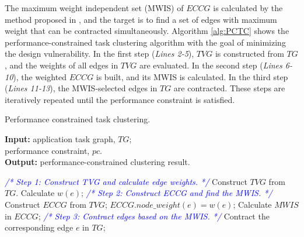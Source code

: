 \documentclass[10pt,journal, compsoc]{IEEEtran}
\begin{document}
The maximum weight independent set (MWIS) of $ECCG$ is calculated by the method proposed in \cite{conference:LC}, and the target is to find a set of edges with maximum weight that can be contracted simultaneously. Algorithm \ref{alg:PCTC} shows the performance-constrained task clustering algorithm with the goal of minimizing the design vulnerability. In the first step (\textit{Lines 2-5}), $TVG$ is constructed from $TG$, and the weights of all edges in $TVG$ are evaluated. In the second step (\textit{Lines 6-10}), the weighted $ECCG$ is built, and its MWIS is calculated. In the third step (\textit{Lines 11-13}), the MWIS-selected edges in $TG$ are contracted. These steps are iteratively repeated until the performance constraint is satisfied.


\begin{algorithm}[!t]
\caption{Performance constrained task clustering.}
\label{alg:PCTC}
\begin{flushleft}
{\textbf{Input:}}
application task graph, $TG$;\\
\hspace*{2.8em}performance constraint, $pc$.\\
{\textbf{Output:}} performance-constrained clustering result.
\end{flushleft}
\begin{algorithmic}[1]
\STATEx \hspace*{-\algorithmicindent}\textit{\textcolor{blue}{/* Step 1: Construct TVG and calculate edge weights. */}}
\STATE Construct $TVG$ from $TG$.
\STATE Calculate $w(e)$;
\ENDFOR
\STATEx \hspace*{-\algorithmicindent}\textit{\textcolor{blue}{/* Step 2: Construct ECCG and find the MWIS. */}}
\STATE Construct $ECCG$ from $TVG$;
\STATE $ECCG.node\_weight(e)=w(e)$;
\ENDFOR
\STATE Calculate $MWIS$ in $ECCG$;
\STATEx \hspace*{-\algorithmicindent}\textit{\textcolor{blue}{/* Step 3: Contract edges based on the MWIS. */}}
    \STATE Contract the corresponding edge $e$ in $TG$;
\ENDFOR
\ENDWHILE
\end{algorithmic}
\end{algorithm}
\end{document}
